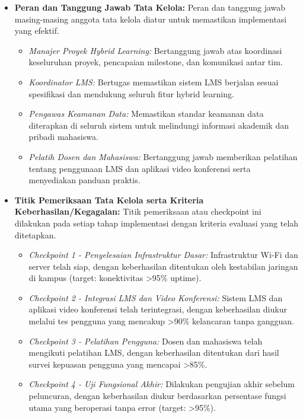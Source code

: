 \begin{itemize}
	\item \textbf{Peran dan Tanggung Jawab Tata Kelola:}
	Peran dan tanggung jawab masing-masing anggota tata kelola diatur untuk memastikan implementasi yang efektif.
	\begin{itemize}
		\item \textit{Manajer Proyek Hybrid Learning:} Bertanggung jawab atas koordinasi keseluruhan proyek, pencapaian milestone, dan komunikasi antar tim.
		\item \textit{Koordinator LMS:} Bertugas memastikan sistem LMS berjalan sesuai spesifikasi dan mendukung seluruh fitur hybrid learning.
		\item \textit{Pengawas Keamanan Data:} Memastikan standar keamanan data diterapkan di seluruh sistem untuk melindungi informasi akademik dan pribadi mahasiswa.
		\item \textit{Pelatih Dosen dan Mahasiswa:} Bertanggung jawab memberikan pelatihan tentang penggunaan LMS dan aplikasi video konferensi serta menyediakan panduan praktis.
	\end{itemize}
	
	\item \textbf{Titik Pemeriksaan Tata Kelola serta Kriteria Keberhasilan/Kegagalan:}
	Titik pemeriksaan atau checkpoint ini dilakukan pada setiap tahap implementasi dengan kriteria evaluasi yang telah ditetapkan.
	\begin{itemize}
		\item \textit{Checkpoint 1 - Penyelesaian Infrastruktur Dasar:} Infrastruktur Wi-Fi dan server telah siap, dengan keberhasilan ditentukan oleh kestabilan jaringan di kampus (target: konektivitas >95\% uptime).
		\item \textit{Checkpoint 2 - Integrasi LMS dan Video Konferensi:} Sistem LMS dan aplikasi video konferensi telah terintegrasi, dengan keberhasilan diukur melalui tes pengguna yang mencakup >90\% kelancaran tanpa gangguan.
		\item \textit{Checkpoint 3 - Pelatihan Pengguna:} Dosen dan mahasiswa telah mengikuti pelatihan LMS, dengan keberhasilan ditentukan dari hasil survei kepuasan pengguna yang mencapai >85\%.
		\item \textit{Checkpoint 4 - Uji Fungsional Akhir:} Dilakukan pengujian akhir sebelum peluncuran, dengan keberhasilan diukur berdasarkan persentase fungsi utama yang beroperasi tanpa error (target: >95\%).
	\end{itemize}
\end{itemize}

